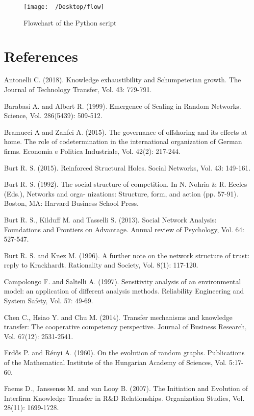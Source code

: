 \documentclass{article}
\begin{document}
\begin{figure}[h]
\centering
\texttt{[image: ~/Desktop/flow]}
\caption{Flowchart of the Python script}
\end{figure}


\newpage
\section{References}

\begin{hangparas}{.25in}{1}


Antonelli C. (2018). Knowledge exhaustibility and Schumpeterian growth. The Journal of Technology Transfer, Vol. 43: 779-791.

Barabasi A. and Albert R. (1999). Emergence of Scaling in Random Networks. Science, Vol. 286(5439): 509-512.

Bramucci A and Zanfei A. (2015). The governance of offshoring and its effects at home. The role of codetermination in the international organization of German firms. Economia e Politica Industriale, Vol. 42(2): 217-244.

Burt R. S. (2015). Reinforced Structural Holes. Social Networks, Vol. 43: 149-161.

Burt R. S. (1992). The social structure of competition. In N. Nohria & R. Eccles (Eds.), Networks and orga- nizations: Structure, form, and action (pp. 57-91). Boston, MA: Harvard Business School Press. 

Burt R. S., Kilduff M. and Tasselli S. (2013). Social Network Analysis: Foundations and Frontiers on Advantage. Annual review of Psychology, Vol. 64: 527-547.

Burt R. S. and Knez M. (1996). A further note on the network structure of trust: reply to Krackhardt. Rationality and Society, Vol. 8(1): 117-120.

Campolongo F. and  Saltelli A. (1997). Sensitivity analysis of an environmental model: an application of different analysis methods. Reliability Engineering and System Safety, Vol. 57: 49-69.

Chen C., Hsiao Y. and Chu M. (2014). Transfer mechanisms and knowledge transfer: The cooperative competency perspective. Journal of Business Research, Vol. 67(12): 2531-2541.

Erdős P. and Rényi A. (1960). On the evolution of random graphs. Publications of the Mathematical Institute of the Hungarian Academy of Sciences, Vol. 5:17-60.

Faems D., Janssenss M. and van Looy B. (2007). The Initiation and Evolution of Interfirm Knowledge Transfer in R&D Relationships. Organization Studies, Vol. 28(11): 1699-1728.


\end{hangparas}
\end{document}
